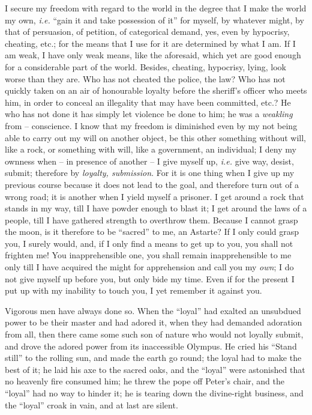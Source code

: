 \documentclass[12pt,a4paper]{book}
\begin{document}
I secure my freedom with regard to the world in the degree that I make the 
world my own, \textit{i.e.} ``gain it and take possession of it'' for 
myself, by whatever might, by that of persuasion, of petition, of categorical 
demand, yes, even by hypocrisy, cheating, etc.; for the means that I use for 
it are determined by what I am. If I am weak, I have only weak means, like the 
aforesaid, which yet are good enough for a considerable part of the world. 
Besides, cheating, hypocrisy, lying, look worse than they are. Who has not 
cheated the police, the law? Who has not quickly taken on an air of honourable 
loyalty before the sheriff's officer who meets him, in order to conceal an 
illegality that may have been committed, etc.? He who has not done it has 
simply let violence be done to him; he was a \textit{weakling} from -- 
conscience. I know that my freedom is diminished even by my not being able to 
carry out my will on another object, be this other something without will, 
like a rock, or something with will, like a government, an individual; I deny 
my ownness when -- in presence of another -- I give myself up, \textit{i.e.} 
give way, desist, submit; therefore by \textit{loyalty, submission}. For it is 
one thing when I give up my previous course because it does not lead to the 
goal, and therefore turn out of a wrong road; it is another when I yield 
myself a prisoner. I get around a rock that stands in my way, till I have 
powder enough to blast it; I get around the laws of a people, till I have 
gathered strength to overthrow them. Because I cannot grasp the moon, is it 
therefore to be ``sacred'' to me, an Astarte? If I only could grasp you, I 
surely would, and, if I only find a means to get up to you, you shall not 
frighten me! You inapprehensible one, you shall remain inapprehensible to me 
only till I have acquired the might for apprehension and call you my 
\textit{own}; I do not give myself up before you, but only bide my time. Even 
if for the present I put up with my inability to touch you, I yet remember it 
against you.

Vigorous men have always done so. When the ``loyal'' had exalted an 
unsubdued power to be their master and had adored it, when they had demanded 
adoration from all, then there came some such son of nature who would not 
loyally submit, and drove the adored power from its inaccessible Olympus. He 
cried his ``Stand still'' to the rolling sun, and made the earth go round; 
the loyal had to make the best of it; he laid his axe to the sacred oaks, and 
the ``loyal'' were astonished that no heavenly fire consumed him; he threw 
the pope off Peter's chair, and the ``loyal'' had no way to hinder it; he is 
tearing down the divine-right business, and the ``loyal'' croak in vain, and 
at last are silent.
\end{document}
